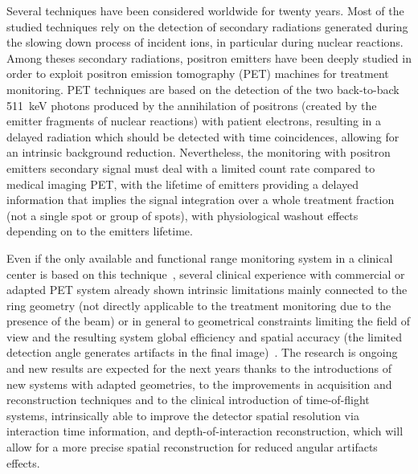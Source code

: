 Several techniques have been considered worldwide for twenty years. Most of the studied techniques rely on the detection of secondary radiations generated during the slowing down process of incident ions, in particular during nuclear reactions. Among theses secondary radiations, positron emitters have been deeply studied in order to exploit positron emission tomography (PET) machines for treatment monitoring. PET techniques are based on the detection of the two back-to-back 511~keV photons produced by the annihilation of positrons (created by the emitter fragments of nuclear reactions) with patient electrons, resulting in a delayed radiation which should be detected with time coincidences, allowing for an intrinsic background reduction. Nevertheless, the monitoring with positron emitters secondary signal must deal with a limited count rate compared to medical imaging PET, with the lifetime of emitters providing a delayed information that implies the signal integration over a whole treatment fraction (not a single spot or group of spots), with physiological washout effects depending on to the emitters lifetime.

Even if the only available and functional range monitoring system in a clinical center is based on this technique~\cite{ENGHARDT2004}, several clinical experience with commercial or adapted PET system already shown intrinsic limitations mainly connected to the ring geometry (not directly applicable to the treatment monitoring due to the presence of the beam) or in general to geometrical constraints limiting the field of view and the resulting system global efficiency and spatial accuracy (the limited detection angle generates artifacts in the final image)~\cite{PARODI2016}. The research is ongoing and new results are expected for the next years thanks to the introductions of new systems with adapted geometries, to the improvements in acquisition and reconstruction techniques and to the clinical introduction of time-of-flight systems, intrinsically able to improve the detector spatial resolution via interaction time information, and depth-of-interaction reconstruction, which will allow for a more precise spatial reconstruction for reduced angular artifacts effects.


